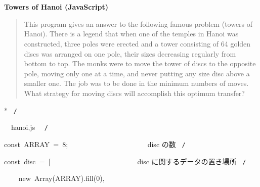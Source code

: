 \documentclass[a4paper,10pt]{article}
\def\mc{\relax}
\begin{document}
\tt\mc 

\noindent
\mbox{}\rm\mc {\tt /}{\tt *}\  \hrulefill *


\ %

\centerline{\bf Towers of Hanoi (JavaScript)}

\begin{quote}

This program gives an answer to the following famous problem (towers of
Hanoi).
There is a legend that when one of the temples in Hanoi was constructed,
three poles were erected and a tower consisting of 64 golden discs was
arranged on one pole, their sizes decreasing regularly from bottom to top.
The monks were to move the tower of discs to the opposite pole, moving
only one at a time, and never putting any size disc above a smaller one.
The job was to be done in the minimum numbers of moves. What strategy for
moving discs will accomplish this optimum transfer?
\end{quote}


* \hrulefill \rm\mc \ {\tt *}{\tt /}
\tt\mc 

\noindent
\mbox{}\hfill

\noindent
\mbox{}\hfill

\noindent
\mbox{}\rm\mc {\tt /}{\tt *}\  \hrulefill\ hanoi.js \ \hrulefill \rm\mc \ {\tt *}{\tt /}
\tt\mc 

\noindent
\mbox{}\hfill

\noindent
\mbox{}\hfill

\noindent
\mbox{}const{\tt\mc \ }ARRAY{\tt\mc \ }={\tt\mc \ }8;{\tt\mc \ }{\tt\mc \ }{\tt\mc \ }{\tt\mc \ }{\tt\mc \ }{\tt\mc \ }{\tt\mc \ }{\tt\mc \ }{\tt\mc \ }{\tt\mc \ }{\tt\mc \ }{\tt\mc \ }{\tt\mc \ }{\tt\mc \ }{\tt\mc \ }{\tt\mc \ }{\tt\mc \ }{\tt\mc \ }{\tt\mc \ }{\tt\mc \ }\rm\mc {\tt /}{\tt *}\  \ disc の数 \hfill \rm\mc \ {\tt *}{\tt /}
\tt\mc 

\noindent
\mbox{}\hfill

\noindent
\mbox{}const{\tt\mc \ }disc{\tt\mc \ }={\tt\mc \ }[{\tt\mc \ }{\tt\mc \ }{\tt\mc \ }{\tt\mc \ }{\tt\mc \ }{\tt\mc \ }{\tt\mc \ }{\tt\mc \ }{\tt\mc \ }{\tt\mc \ }{\tt\mc \ }{\tt\mc \ }{\tt\mc \ }{\tt\mc \ }{\tt\mc \ }{\tt\mc \ }{\tt\mc \ }{\tt\mc \ }{\tt\mc \ }{\tt\mc \ }{\tt\mc \ }{\tt\mc \ }\rm\mc {\tt /}{\tt *}\  \ disc に関するデータの置き場所 \hfill \rm\mc \ {\tt *}{\tt /}
\tt\mc 

\noindent
\mbox{}{\tt\mc \ }{\tt\mc \ }{\tt\mc \ }{\tt\mc \ }new{\tt\mc \ }Array(ARRAY).fill(0),
\end{document}

